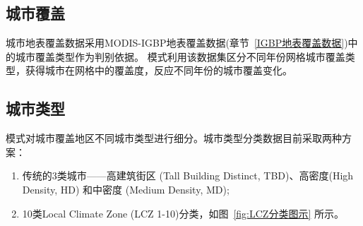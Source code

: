 \subsection{城市覆盖}\label{城市覆盖}
城市地表覆盖数据采用MODIS-IGBP地表覆盖数据(章节~\ref{IGBP地表覆盖数据})中的城市覆盖类型作为判别依据。
模式利用该数据集区分不同年份网格城市覆盖类型，获得城市在网格中的覆盖度，反应不同年份的城市覆盖变化。


\subsection{城市类型}\label{城市类型}
模式对城市覆盖地区不同城市类型进行细分。城市类型分类数据目前采取两种方案：
\begin{enumerate}
    \item 传统的3类城市——高建筑街区 (Tall Building Distinct, TBD)、高密度(High Density, HD) 和中密度 (Medium Density, MD);
    \item 10类Local Climate Zone (LCZ 1-10)分类，如图~\ref{fig:LCZ分类图示}  所示。
\end{enumerate}


